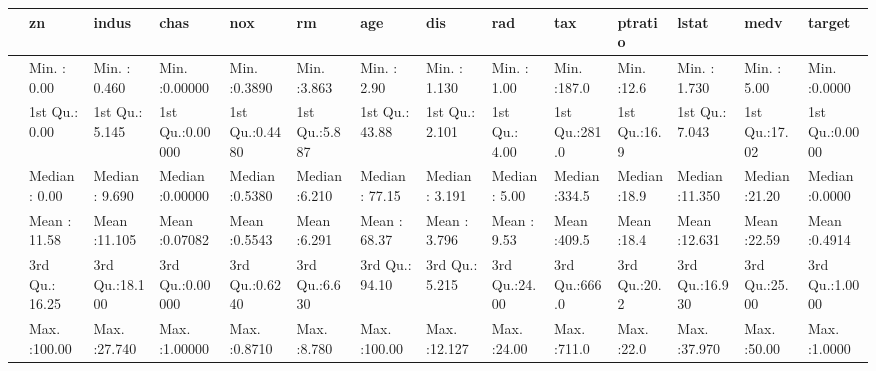 \documentclass[
]{article}
\newenvironment{Shaded}{\begin{snugshade}}{\end{snugshade}}
\newcommand{\AttributeTok}[1]{\textcolor[rgb]{0.77,0.63,0.00}{#1}}
\newcommand{\ConstantTok}[1]{\textcolor[rgb]{0.00,0.00,0.00}{#1}}
\newcommand{\DecValTok}[1]{\textcolor[rgb]{0.00,0.00,0.81}{#1}}
\newcommand{\FunctionTok}[1]{\textcolor[rgb]{0.00,0.00,0.00}{#1}}
\newcommand{\NormalTok}[1]{#1}
\newcommand{\OtherTok}[1]{\textcolor[rgb]{0.56,0.35,0.01}{#1}}
\newcommand{\SpecialCharTok}[1]{\textcolor[rgb]{0.00,0.00,0.00}{#1}}
\begin{document}
\begin{table}[H]
\centering
\begin{tabular}{l|l|l|l|l|l|l|l|l|l|l|l|l|l}
\hline
  &       zn &     indus &      chas &      nox &       rm &      age &      dis &      rad &      tax &    ptratio &     lstat &      medv &     target\\
\hline
 & Min.   :  0.00 & Min.   : 0.460 & Min.   :0.00000 & Min.   :0.3890 & Min.   :3.863 & Min.   :  2.90 & Min.   : 1.130 & Min.   : 1.00 & Min.   :187.0 & Min.   :12.6 & Min.   : 1.730 & Min.   : 5.00 & Min.   :0.0000\\
\hline
 & 1st Qu.:  0.00 & 1st Qu.: 5.145 & 1st Qu.:0.00000 & 1st Qu.:0.4480 & 1st Qu.:5.887 & 1st Qu.: 43.88 & 1st Qu.: 2.101 & 1st Qu.: 4.00 & 1st Qu.:281.0 & 1st Qu.:16.9 & 1st Qu.: 7.043 & 1st Qu.:17.02 & 1st Qu.:0.0000\\
\hline
 & Median :  0.00 & Median : 9.690 & Median :0.00000 & Median :0.5380 & Median :6.210 & Median : 77.15 & Median : 3.191 & Median : 5.00 & Median :334.5 & Median :18.9 & Median :11.350 & Median :21.20 & Median :0.0000\\
\hline
 & Mean   : 11.58 & Mean   :11.105 & Mean   :0.07082 & Mean   :0.5543 & Mean   :6.291 & Mean   : 68.37 & Mean   : 3.796 & Mean   : 9.53 & Mean   :409.5 & Mean   :18.4 & Mean   :12.631 & Mean   :22.59 & Mean   :0.4914\\
\hline
 & 3rd Qu.: 16.25 & 3rd Qu.:18.100 & 3rd Qu.:0.00000 & 3rd Qu.:0.6240 & 3rd Qu.:6.630 & 3rd Qu.: 94.10 & 3rd Qu.: 5.215 & 3rd Qu.:24.00 & 3rd Qu.:666.0 & 3rd Qu.:20.2 & 3rd Qu.:16.930 & 3rd Qu.:25.00 & 3rd Qu.:1.0000\\
\hline
 & Max.   :100.00 & Max.   :27.740 & Max.   :1.00000 & Max.   :0.8710 & Max.   :8.780 & Max.   :100.00 & Max.   :12.127 & Max.   :24.00 & Max.   :711.0 & Max.   :22.0 & Max.   :37.970 & Max.   :50.00 & Max.   :1.0000\\
\hline
\end{tabular}
\end{table}

\begin{Shaded}
\end{Shaded}
\end{document}
